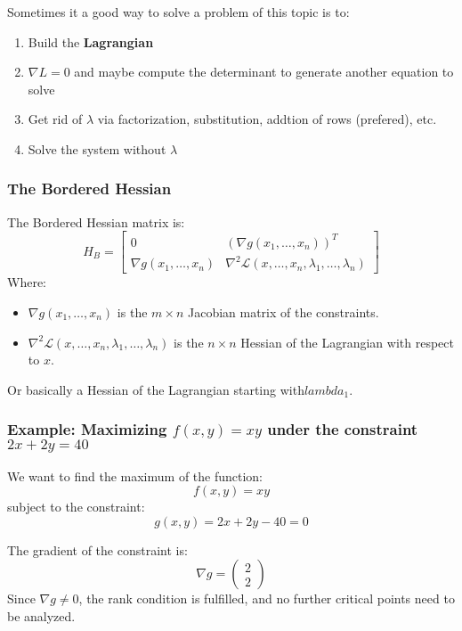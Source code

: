 Sometimes it a good way to solve a problem of this topic is to:

\begin{enumerate}
    \item Build the \textbf{Lagrangian}
    \item \(\nabla L = 0\) and maybe compute the determinant to generate another equation to solve
    \item Get rid of \(\lambda\) via factorization, substitution, addtion of rows (prefered), etc.
    \item Solve the system without \(\lambda\)
\end{enumerate}

\subsubsection{The Bordered Hessian}
The Bordered Hessian matrix is:
\[
H_B =
\begin{bmatrix}
0 & \left( \nabla g(x_1, \dots, x_n) \right)^T \\
\nabla g(x_1, \dots, x_n) & \nabla^2 \mathcal{L}(x, \dots, x_n, \lambda_1, \dots, \lambda_n)
\end{bmatrix}
\]
Where:
\begin{itemize}
  \item \( \nabla  g(x_1, \dots, x_n) \) is the \( m \times n \) Jacobian matrix of the constraints.
  \item \( \nabla^2 \mathcal{L}(x, \dots, x_n, \lambda_1, \dots, \lambda_n) \) is the \( n \times n \) Hessian of the Lagrangian with respect to \( x \).
\end{itemize}

Or basically a Hessian of the Lagrangian starting with\(lambda_1\).

\subsubsection*{Example: Maximizing \( f(x, y) = xy \) under the constraint \( 2x + 2y = 40 \)}

We want to find the maximum of the function:
\[
f(x, y) = xy
\]
subject to the constraint:
\[
g(x, y) = 2x + 2y - 40 = 0
\]

The gradient of the constraint is:
\[
\nabla g = \begin{pmatrix} 2 \\ 2 \end{pmatrix}
\]
Since \( \nabla g \ne 0 \), the rank condition is fulfilled, and no further critical points need to be analyzed.

